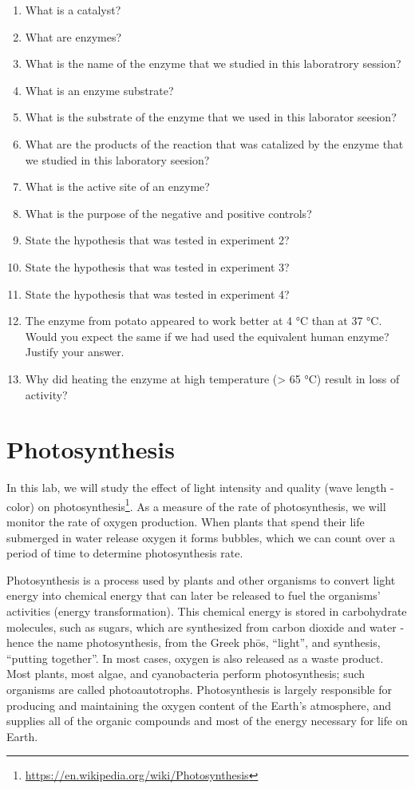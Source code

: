 \documentclass[]{book}
\providecommand{\tightlist}{%
  \setlength{\itemsep}{0pt}\setlength{\parskip}{0pt}}
\let\rmarkdownfootnote\footnote%
\def\footnote{\protect\rmarkdownfootnote}
\renewcommand{\href}[2]{#2\footnote{\url{#1}}}
\begin{document}
\begin{enumerate}
\def\labelenumi{\arabic{enumi}.}
\tightlist
\item
  What is a catalyst?
\item
  What are enzymes?
\item
  What is the name of the enzyme that we studied in this laboratrory session?
\item
  What is an enzyme substrate?
\item
  What is the substrate of the enzyme that we used in this laborator seesion?
\item
  What are the products of the reaction that was catalized by the enzyme that we studied in this laboratory seesion?
\item
  What is the active site of an enzyme?
\item
  What is the purpose of the negative and positive controls?
\item
  State the hypothesis that was tested in experiment 2?
\item
  State the hypothesis that was tested in experiment 3?
\item
  State the hypothesis that was tested in experiment 4?
\item
  The enzyme from potato appeared to work better at 4 °C than at 37 °C. Would you expect the same if we had used the equivalent human enzyme? Justify your answer.
\item
  Why did heating the enzyme at high temperature (\textgreater{} 65 °C) result in loss of activity?
\end{enumerate}

\hypertarget{photosynthesis}{%
\chapter{Photosynthesis}\label{photosynthesis}}

In this lab, we will study the effect of light intensity and quality (wave length - color) on \href{https://en.wikipedia.org/wiki/Photosynthesis}{photosynthesis}. As a measure of the rate of photosynthesis, we will monitor the rate of oxygen production. When plants that spend their life submerged in water release oxygen it forms bubbles, which we can count over a period of time to determine photosynthesis rate.

Photosynthesis is a process used by plants and other organisms to convert light energy into chemical energy that can later be released to fuel the organisms' activities (energy transformation). This chemical energy is stored in carbohydrate molecules, such as sugars, which are synthesized from carbon dioxide and water - hence the name photosynthesis, from the Greek phōs, ``light'', and synthesis, ``putting together''. In most cases, oxygen is also released as a waste product. Most plants, most algae, and cyanobacteria perform photosynthesis; such organisms are called photoautotrophs. Photosynthesis is largely responsible for producing and maintaining the oxygen content of the Earth's atmosphere, and supplies all of the organic compounds and most of the energy necessary for life on Earth.
\end{document}
